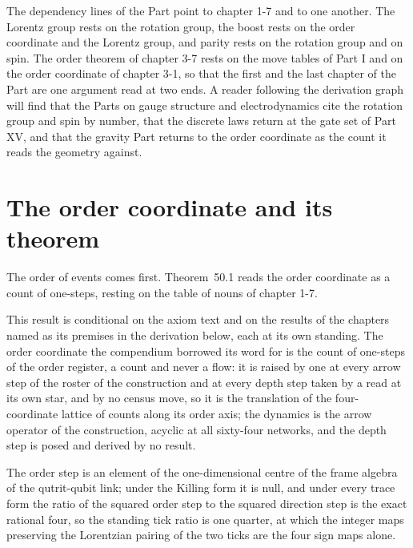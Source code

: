 The dependency lines of the Part point to chapter 1-7 and to one another. The Lorentz group rests on the rotation group, the boost rests on the order coordinate and the Lorentz group, and parity rests on the rotation group and on spin. The order theorem of chapter 3-7 rests on the move tables of Part I and on the order coordinate of chapter 3-1, so that the first and the last chapter of the Part are one argument read at two ends. A reader following the derivation graph will find that the Parts on gauge structure and electrodynamics cite the rotation group and spin by number, that the discrete laws return at the gate set of Part XV, and that the gravity Part returns to the order coordinate as the count it reads the geometry against.
\section{The order coordinate and its theorem}\label{mod:III-1-order-coordinate-and-its-theorem}
\label{narr:open:3-1}The order of events comes first. Theorem~50.1 reads the order coordinate as a count of one-steps, resting on the table of nouns of chapter 1-7.
\begin{chconditional}\label{box:III-1-order-coordinate-and-its-theorem:1}
This result is conditional on the axiom text and on the results of the chapters named as its premises in the derivation below, each at its own standing.
The order coordinate the compendium borrowed its word for is the count of one-steps of the order register, a count and never a flow: it is raised by one at every arrow step of the roster of the construction and at every depth step taken by a read at its own star, and by no census move, so it is the translation of the four-coordinate lattice of counts along its order axis; the dynamics is the arrow operator of the construction, acyclic at all sixty-four networks, and the depth step is posed and derived by no result.
\end{chconditional}
The order step is an element of the one-dimensional centre of the frame algebra of the qutrit-qubit link; under the Killing form it is null, and under every trace form the ratio of the squared order step to the squared direction step is the exact rational four, so the standing tick ratio is one quarter, at which the integer maps preserving the Lorentzian pairing of the two ticks are the four sign maps alone.
